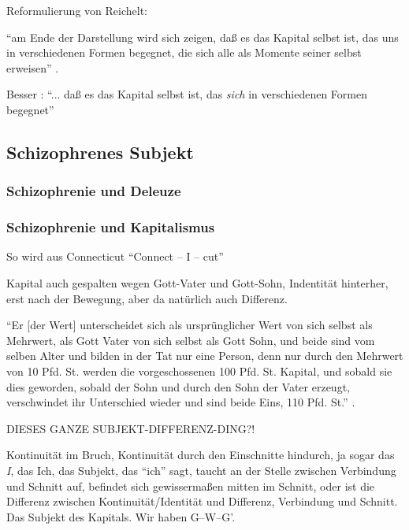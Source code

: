 \documentclass[12pt,
               DIV13,
               paper=a4,
               twoside=false,
               onehalfspacing,
               bibliography=totoc,
               toc=graduated,
               draft,
               ]{scrartcl}
\newcommand{\pc}[2]{\parencite[#1]{#2}}
\newcommand{\worries}[1]{\ifdraft{\textcolor{blue}{\texttt{(#1)}}}{}}
\newcommand{\gwg}{G--W--G'\xspace}
\begin{document}
Reformulierung von Reichelt:

"`am Ende der Darstellung wird sich zeigen, daß es das Kapital selbst
ist, das uns in verschiedenen Formen begegnet, die sich alle als
Momente seiner selbst erweisen"' \pc{181}{reichelt}.

Besser \worries{?}: "`... daß es das Kapital selbst ist, das
\emph{sich} in verschiedenen Formen begegnet"'



\subsection{Schizophrenes Subjekt}

\subsubsection{Schizophrenie und Deleuze}

\subsubsection{Schizophrenie und Kapitalismus}

So wird aus Connecticut "`Connect -- I -- cut"' \pc{48}{ao}

Kapital auch gespalten wegen Gott-Vater und Gott-Sohn, Indentität
hinterher, erst nach der Bewegung, aber da natürlich auch Differenz.

"`Er [der Wert] unterscheidet sich als ursprünglicher Wert von sich
selbst als Mehrwert, als Gott Vater von sich selbst als Gott Sohn, und
beide sind vom selben Alter und bilden in der Tat nur eine Person,
denn nur durch den Mehrwert von 10 Pfd. St. werden die vorgeschossenen
100 Pfd. St. Kapital, und sobald sie dies geworden, sobald der Sohn
und durch den Sohn der Vater erzeugt, verschwindet ihr Unterschied
wieder und sind beide Eins, 110 Pfd. St."' \pc{S. 169 f.}{kap}.

DIESES GANZE SUBJEKT-DIFFERENZ-DING?!

Kontinuität im Bruch, Kontinuität durch den Einschnitte hindurch, ja
sogar das \emph{I}, das Ich, das Subjekt, das "`ich"' sagt, taucht an
der Stelle zwischen Verbindung und Schnitt auf, befindet sich
gewissermaßen mitten im Schnitt, oder ist die Differenz zwischen
Kontinuität/Identität und Differenz, Verbindung und Schnitt. Das
Subjekt des Kapitals. Wir haben \gwg.
\end{document}
